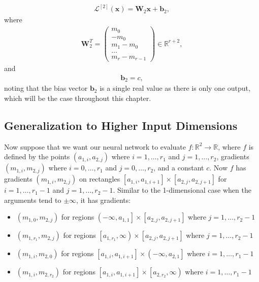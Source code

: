 \documentclass{somasmsc}
\begin{document}
\begin{align*}
\mathcal{L}^{\left[2\right]}\left(\pmb{x}\right) = \mathbf{W}_2 \pmb{x} + \pmb{b}_2,
\end{align*}
where
\begin{align*}
\mathbf{W}_2^T =
\begin{pmatrix}
    m_0 \\
    -m_0 \\
    m_1 - m_0 \\
    \dots \\
    m_r - m_{r-1}
\end{pmatrix} \in \mathbb{R}^{r+2},
\end{align*}
and
\begin{align*}
\pmb{b}_2 = c,
\end{align*}
noting that the bias vector $\pmb{b}_2$ is a single real value as there is only one output, which will be the case throughout this chapter.


\subsection{Generalization to Higher Input Dimensions}\label{piece:nd}

Now suppose that we want our neural network to evaluate $f:\mathbb{R}^2 \rightarrow \mathbb{R}$, where $f$ is defined by the points $\left(a_{1,i}, a_{2,j}\right)$ where $i=1, \dots, r_1$ and $j=1, \dots, r_2$, gradients $\left(m_{1,i}, m_{2,j}\right)$ where $i=0, \dots, r_1$ and $j=0, \dots, r_2$, and a constant $c$. Now $f$ has gradients $\left(m_{1,i}, m_{2,j}\right)$ on rectangles $\left[a_{1,i}, a_{1,i+1}\right] \times \left[a_{2,j}, a_{2,j+1}\right]$ for $i=1, \dots, r_1 - 1$ and $j=1, \dots, r_2 - 1$. Similar to the 1-dimensional case when the arguments tend to $\pm \infty$, it has gradients:
\begin{itemize}
    \item $\left(m_{1,0}, m_{2,j}\right)$ for regions $\left(-\infty, a_{1,1}\right] \times \left[a_{2,j}, a_{2,j+1}\right]$ where $j=1, \dots, r_2 - 1$
    \item $\left(m_{1,r_1}, m_{2,j}\right)$ for regions $\left[a_{1, r_1}, \infty\right) \times \left[a_{2,j}, a_{2,j+1}\right]$ where $j=1, \dots, r_2 - 1$
    \item $\left(m_{1,i}, m_{2,0}\right)$ for regions $\left[a_{1,i}, a_{1,i+1}\right] \times \left(-\infty, a_{2,1}\right]$ where $i=1, \dots, r_1 - 1$
    \item $\left(m_{1,i}, m_{2,r_2}\right)$ for regions $\left[a_{1,i}, a_{1,i+1}\right] \times \left[a_{2,r_2}, \infty\right)$ where $i=1, \dots, r_1 - 1$
\end{itemize}
\end{document}
